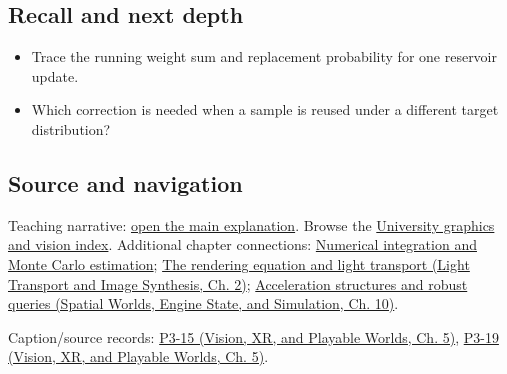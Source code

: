 \subsection{Recall and next depth}\label{appendix-68be451b78b1-recall-and-next-depth}

\hypertarget{appendix-68be451b78b1-recall-and-next-depth}{}

\begin{itemize}
\tightlist
\item
  Trace the running weight sum and replacement probability for one reservoir update.
\item
  Which correction is needed when a sample is reused under a different target distribution?
\end{itemize}

\subsection{Source and navigation}\label{appendix-68be451b78b1-source-and-navigation}

\hypertarget{appendix-68be451b78b1-source-and-navigation}{}

Teaching narrative: \hyperref[03-visual-computing-i-ch012-numerical-integration-and-monte-carlo-estimation]{open the main explanation}. Browse the \hyperref[appendix-a6d556a4ef50-university-graphics-vision-and-photography---independent-series]{University graphics and vision index}. Additional chapter connections: \hyperref[03-visual-computing-i-ch012-numerical-integration-and-monte-carlo-estimation]{Numerical integration and Monte Carlo estimation}; \href{../04-Light-Transport-and-Image-Synthesis/main.pdf\#nameddest=03-visual-computing-i-ch007-the-rendering-equation-and-light-transport}{The rendering equation and light transport (Light Transport and Image Synthesis, Ch. 2)}; \href{../05-Spatial-Worlds-Engine-State-and-Simulation/main.pdf\#nameddest=04-visual-computing-ii-ch029-acceleration-structures-and-robust-queries-1}{Acceleration structures and robust queries (Spatial Worlds, Engine State, and Simulation, Ch. 10)}.

Caption/source records: \href{../07-Vision-XR-and-Playable-Worlds/main.pdf\#nameddest=04-visual-computing-ii-ch036-p3-15---ray-tracing}{P3-15 (Vision, XR, and Playable Worlds, Ch. 5)}, \href{../07-Vision-XR-and-Playable-Worlds/main.pdf\#nameddest=04-visual-computing-ii-ch036-p3-19---shadows-part-2}{P3-19 (Vision, XR, and Playable Worlds, Ch. 5)}.
